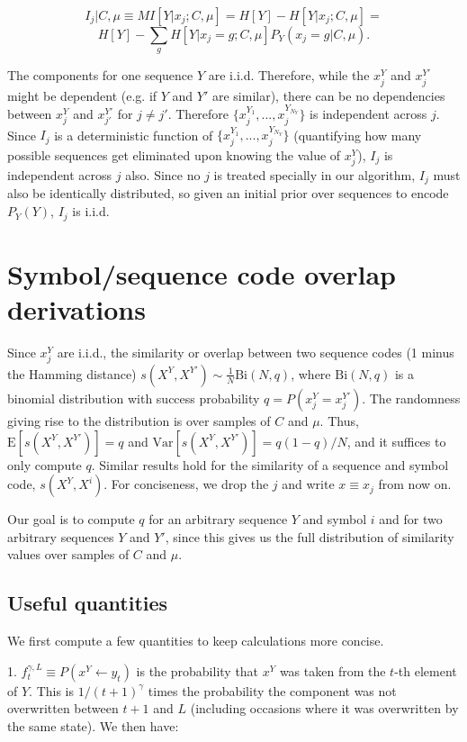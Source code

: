 \documentclass{article}
\begin{document}
\begin{appendices}
$$I_j | C, \mu \equiv MI[Y|x_j; C, \mu] = H[Y] - H[Y|x_j; C, \mu] = $$
$$H[Y] - \sum_g H[Y|x_j = g; C, \mu] P_Y(x_j = g| C, \mu).$$

The components for one sequence $Y$ are i.i.d. Therefore, while the $x^Y_j$ and $x^{Y'}_j$ might be dependent (e.g. if $Y$ and $Y'$ are similar), there can be no dependencies between $x^Y_j$ and $x^{Y'}_{j'}$ for $j \neq j'$. Therefore $\{x^{Y_1}_j, ..., x^{Y_{N_Y}}_j\}$ is independent across $j$. Since $I_j$ is a deterministic function of $\{x^{Y_1}_j, ..., x^{Y_{N_Y}}_j\}$ (quantifying how many possible sequences get eliminated upon knowing the value of $x^Y_j$), $I_j$ is independent across $j$ also. Since no $j$ is treated specially in our algorithm, $I_j$ must also be identically distributed, so given an initial prior over sequences to encode $P_Y(Y)$, $I_j$ is i.i.d.

\section{Symbol/sequence code overlap derivations}

Since $x^Y_j$ are i.i.d., the similarity or overlap between two sequence codes  (1 minus the Hamming distance) $s(X^Y, X^{Y'}) \sim \frac{1}{N}\textrm{Bi}(N, q)$, where $\textrm{Bi}(N, q)$ is a binomial distribution with success probability $q = P(x^Y_j = x^{Y'}_j)$. The randomness giving rise to the distribution is over samples of $C$ and $\mu$. Thus, $\textrm{E}[s(X^Y, X^{Y'})] = q$ and $\textrm{Var}[s(X^Y, X^{Y'})] = q(1-q)/N$, and it suffices to only compute $q$. Similar results hold for the similarity of a sequence and symbol code, $s(X^Y, X^i)$. For conciseness, we drop the $j$ and write $x \equiv x_j$ from now on.

Our goal is to compute $q$ for an arbitrary sequence $Y$ and symbol $i$ and for two arbitrary sequences $Y$ and $Y'$, since this gives us the full distribution of similarity values over samples of $C$ and $\mu$.

\subsection{Useful quantities}

We first compute a few quantities to keep calculations more concise.

1. $f^{\gamma,L}_t \equiv P(x^Y \leftarrow y_t)$ is the probability that $x^Y$ was taken from the $t$-th element of $Y$. This is $1/(t+1)^\gamma$ times the probability the component was not overwritten between $t+1$ and $L$ (including occasions where it was overwritten by the same state). We then have:


\end{appendices}
\end{document}
